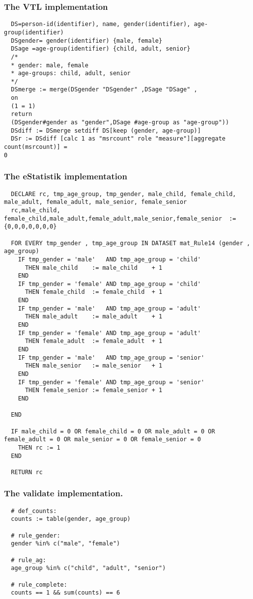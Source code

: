 \subsubsection*{The VTL implementation}
\begin{verbatim}
  DS=person-id(identifier), name, gender(identifier), age-group(identifier)
  DSgender= gender(identifier) {male, female}
  DSage =age-group(identifier) {child, adult, senior}
  /*
  * gender: male, female
  * age-groups: child, adult, senior
  */
  DSmerge := merge(DSgender "DSgender" ,DSage "DSage" ,
  on
  (1 = 1)
  return
  (DSgender#gender as "gender",DSage #age-group as "age-group"))
  DSdiff := DSmerge setdiff DS[keep (gender, age-group)]
  DSr := DSdiff [calc 1 as "msrcount" role "measure"][aggregate count(msrcount)] =
0
\end{verbatim}
\subsubsection*{The eStatistik implementation}
\begin{verbatim}
  DECLARE rc, tmp_age_group, tmp_gender, male_child, female_child, male_adult, female_adult, male_senior, female_senior
  rc,male_child, female_child,male_adult,female_adult,male_senior,female_senior  := {0,0,0,0,0,0,0}

  FOR EVERY tmp_gender , tmp_age_group IN DATASET mat_Rule14 (gender , age_group)
    IF tmp_gender = 'male'   AND tmp_age_group = 'child'
      THEN male_child    := male_child    + 1
    END
    IF tmp_gender = 'female' AND tmp_age_group = 'child'   
      THEN female_child  := female_child  + 1
    END
    IF tmp_gender = 'male'   AND tmp_age_group = 'adult'  
      THEN male_adult    := male_adult    + 1
    END
    IF tmp_gender = 'female' AND tmp_age_group = 'adult'  
      THEN female_adult  := female_adult  + 1
    END
    IF tmp_gender = 'male'   AND tmp_age_group = 'senior' 
      THEN male_senior   := male_senior   + 1
    END
    IF tmp_gender = 'female' AND tmp_age_group = 'senior' 
      THEN female_senior := female_senior + 1
    END

  END
  
  IF male_child = 0 OR female_child = 0 OR male_adult = 0 OR female_adult = 0 OR male_senior = 0 OR female_senior = 0 
    THEN rc := 1
  END

  RETURN rc
\end{verbatim}
\subsubsection*{The validate implementation.}
\begin{verbatim}
  # def_counts:
  counts := table(gender, age_group)

  # rule_gender:
  gender %in% c("male", "female")

  # rule_ag:
  age_group %in% c("child", "adult", "senior")

  # rule_complete:
  counts == 1 && sum(counts) == 6
\end{verbatim}


